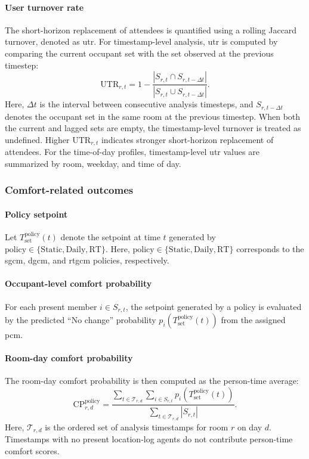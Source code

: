 \paragraph{User turnover rate}
The short-horizon replacement of attendees is quantified using a rolling Jaccard turnover, denoted as \ac{utr}.
For timestamp-level analysis, \ac{utr} is computed by comparing the current occupant set with the set observed at the previous timestep:
\begin{equation}
\mathrm{UTR}_{r,t}
=
1
-
\frac{
|S_{r,t}\cap S_{r,t-\Delta t}|
}{
|S_{r,t}\cup S_{r,t-\Delta t}|
}.
\label{eq:rolling_turnover}
\end{equation}
Here, $\Delta t$ is the interval between consecutive analysis timesteps, and $S_{r,t-\Delta t}$ denotes the occupant set in the same room at the previous timestep.
When both the current and lagged sets are empty, the timestamp-level turnover is treated as undefined.
Higher $\mathrm{UTR}_{r,t}$ indicates stronger short-horizon replacement of attendees.
For the time-of-day profiles, timestamp-level \ac{utr} values are summarized by room, weekday, and time of day.

\subsubsection{Comfort-related outcomes}
\label{subsec:comfMetrics}

\paragraph{Policy setpoint}
Let $T_{\mathrm{set}}^{\mathrm{policy}}(t)$ denote the setpoint at time $t$ generated by $\mathrm{policy}\in\{\mathrm{Static},\mathrm{Daily},\mathrm{RT}\}$.
Here, $\mathrm{policy}\in\{\mathrm{Static},\mathrm{Daily},\mathrm{RT}\}$ corresponds to the \ac{sgcm}, \ac{dgcm}, and \ac{rtgcm} policies, respectively.

\paragraph{Occupant-level comfort probability}
For each present member $i\in S_{r,t}$, the setpoint generated by a policy is evaluated by the predicted ``No change'' probability $p_i(T_{\mathrm{set}}^{\mathrm{policy}}(t))$ from the assigned \ac{pcm}.

\paragraph{Room-day comfort probability}
The room-day comfort probability is then computed as the person-time average:
\begin{equation}
\mathrm{CP}_{r,d}^{\mathrm{policy}}
=
\frac{
\sum_{t\in\mathcal{T}_{r,d}}
\sum_{i\in S_{r,t}}
p_i\!\left(T_{\mathrm{set}}^{\mathrm{policy}}(t)\right)
}{
\sum_{t\in\mathcal{T}_{r,d}}
|S_{r,t}|
}.
\label{eq:comfort_probability_daily}
\end{equation}
Here, $\mathcal{T}_{r,d}$ is the ordered set of analysis timestamps for room $r$ on day $d$.
Timestamps with no present location-log agents do not contribute person-time comfort scores.

